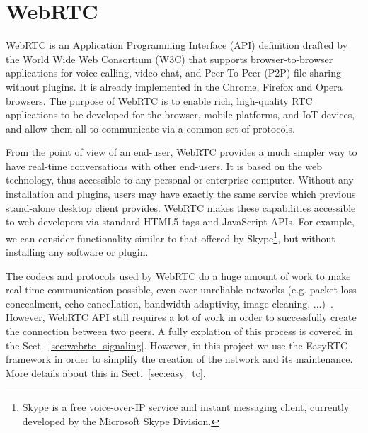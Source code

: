 
\chapter{WebRTC}
\label{cha:webrtc}

WebRTC is an Application Programming Interface (API) definition drafted by the World Wide Web Consortium (W3C) that supports browser-to-browser applications for voice calling, video chat, and Peer-To-Peer (P2P) file sharing without plugins. It is already implemented in the Chrome, Firefox and Opera browsers. The purpose of WebRTC is to enable rich, high-quality RTC applications to be developed for the browser, mobile platforms, and IoT devices, and allow them all to communicate via a common set of protocols. 

From the point of view of an end-user, WebRTC provides a much simpler way to have real-time conversations with other end-users. It is based on the web technology, thus accessible to any personal or enterprise computer. Without any installation and plugins, users may have exactly the same service which previous stand-alone desktop client provides. WebRTC makes these capabilities accessible to web developers via standard HTML5 tags and JavaScript APIs. For example, we can consider functionality similar to that offered by Skype\footnote{Skype is a free voice-over-IP service and instant messaging client, currently developed by the Microsoft Skype Division.}, but without installing any software or plugin. 

The codecs and protocols used by WebRTC do a huge amount of work to make real-time communication possible, even over unreliable networks (e.g. packet loss concealment, echo cancellation, bandwidth adaptivity, image cleaning, ...)~\cite{started_with_webrtc}. However, WebRTC API still requires a lot of work in order to successfully create the connection between two peers. A fully explation of this process is covered in the Sect.~\ref{sec:webrtc_signaling}. However, in this project we use the EasyRTC~\cite{easyrtc} framework in order to simplify the creation of the network and its maintenance. More details about this in Sect.~\ref{sec:easy_tc}.

